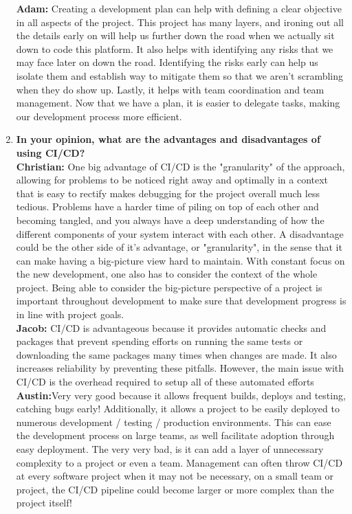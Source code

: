 \documentclass{article}
\begin{document}
\begin{enumerate}
  \textbf{Adam:} Creating a development plan can help with defining a clear objective in all aspects of the project. This project has many layers, and ironing out all the details early on will help us further down the road when we actually sit down to code this platform. It also helps with identifying any risks that we may face later on down the road. Identifying the risks early can help us isolate them and establish way to mitigate them so that we aren't scrambling when they do show up. Lastly, it helps with team coordination and team management. Now that we have a plan, it is easier to delegate tasks, making our development process more efficient. \\

  \item \textbf{In your opinion, what are the advantages and disadvantages of using CI/CD?}\\

  \textbf{Christian:} One big advantage of CI/CD is the "granularity" of the approach, allowing for problems to be noticed right away and optimally in a context that is easy to rectify makes debugging for the project overall much less tedious. Problems have a harder time of piling on top of each other and becoming tangled, and you always have a deep understanding of how the different components of your system interact with each other. A disadvantage could be the other side of it's advantage, or "granularity", in the sense that it can make having a big-picture view hard to maintain. With constant focus on the new development, one also has to consider the context of the whole project. Being able to consider the big-picture perspective of a project is important throughout development to make sure that development progress is in line with project goals.\\

  \textbf{Jacob:}  CI/CD is advantageous because it provides automatic checks and packages that prevent spending efforts on running the same tests or downloading the same packages many times when changes are made. It also increases reliability by preventing these pitfalls. However, the main issue with CI/CD is the overhead required to setup all of these automated efforts\\

  \textbf{Austin:}Very very good because it allows frequent builds, deploys and testing, catching bugs early! Additionally, it allows a project to be easily deployed to numerous development / testing / production environments. This can ease the development process on large teams, as well facilitate adoption through easy deployment. The very very bad, is it can add a layer of unnecessary complexity to a project or even a team. Management can often throw CI/CD at every software project when it may not be necessary, on a small team or project, the CI/CD pipeline could become larger or more complex than the project itself!\\


\end{enumerate}
\end{document}
